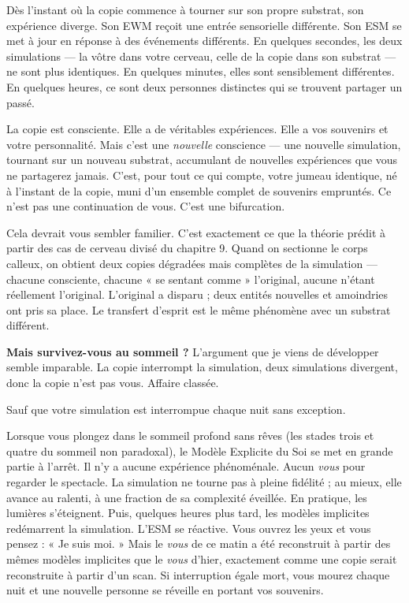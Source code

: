 \documentclass[11pt, twoside, openright]{book}
\begin{document}
Dès l'instant où la copie commence à tourner sur son propre substrat, son expérience diverge. Son EWM reçoit une entrée sensorielle différente. Son ESM se met à jour en réponse à des événements différents. En quelques secondes, les deux simulations --- la vôtre dans votre cerveau, celle de la copie dans son substrat --- ne sont plus identiques. En quelques minutes, elles sont sensiblement différentes. En quelques heures, ce sont deux personnes distinctes qui se trouvent partager un passé.

La copie est consciente. Elle a de véritables expériences. Elle a vos souvenirs et votre personnalité. Mais c'est une \textit{nouvelle} conscience --- une nouvelle simulation, tournant sur un nouveau substrat, accumulant de nouvelles expériences que vous ne partagerez jamais. C'est, pour tout ce qui compte, votre jumeau identique, né à l'instant de la copie, muni d'un ensemble complet de souvenirs empruntés. Ce n'est pas une continuation de vous. C'est une bifurcation.

Cela devrait vous sembler familier. C'est exactement ce que la théorie prédit à partir des cas de cerveau divisé du chapitre 9. Quand on sectionne le corps calleux, on obtient deux copies dégradées mais complètes de la simulation --- chacune consciente, chacune « se sentant comme » l'original, aucune n'étant réellement l'original. L'original a disparu ; deux entités nouvelles et amoindries ont pris sa place. Le transfert d'esprit est le même phénomène avec un substrat différent.

\textbf{Mais survivez-vous au sommeil ?} L'argument que je viens de développer semble imparable. La copie interrompt la simulation, deux simulations divergent, donc la copie n'est pas vous. Affaire classée.

Sauf que votre simulation est interrompue chaque nuit sans exception.

Lorsque vous plongez dans le sommeil profond sans rêves (les stades trois et quatre du sommeil non paradoxal), le Modèle Explicite du Soi se met en grande partie à l'arrêt. Il n'y a aucune expérience phénoménale. Aucun \textit{vous} pour regarder le spectacle. La simulation ne tourne pas à pleine fidélité ; au mieux, elle avance au ralenti, à une fraction de sa complexité éveillée. En pratique, les lumières s'éteignent. Puis, quelques heures plus tard, les modèles implicites redémarrent la simulation. L'ESM se réactive. Vous ouvrez les yeux et vous pensez : « Je suis moi. » Mais le \textit{vous} de ce matin a été reconstruit à partir des mêmes modèles implicites que le \textit{vous} d'hier, exactement comme une copie serait reconstruite à partir d'un scan. Si interruption égale mort, vous mourez chaque nuit et une nouvelle personne se réveille en portant vos souvenirs.
\end{document}
